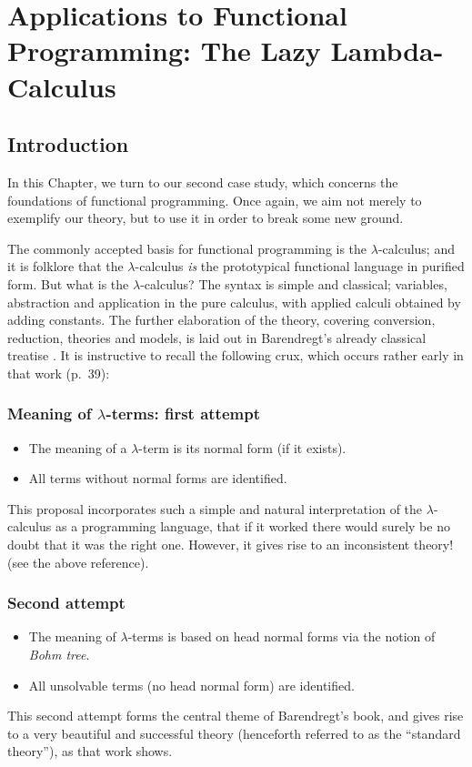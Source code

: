 \chapter{Applications to Functional Programming: 
The Lazy Lambda-Calculus}
\section{Introduction}
In this Chapter, we turn to our second case study, which concerns the 
foundations of functional programming. 
Once again, we aim not merely to exemplify our theory, 
but to use it in order to break some new ground.

The commonly accepted basis for functional programming is the 
$\lambda$-calculus; 
and it is folklore that the $\lambda$-calculus {\em is} the prototypical 
functional language in purified form. But what is the $\lambda$-calculus? 
The syntax is simple and classical; variables, abstraction and application 
in the pure calculus, with applied calculi obtained by adding constants. 
The further elaboration of the theory, covering conversion, reduction, 
theories and models, is laid out in Barendregt's already classical treatise 
\cite{Bar}. 
It is instructive to recall the following crux, which occurs rather early 
in that work (p.\  39):
\subsection*{Meaning of $\lambda$-terms: first attempt}
\begin{itemize}
\item The meaning of a $\lambda$-term is its normal form (if it exists).
\item All terms without normal forms are identified.
\end{itemize}
This proposal incorporates such a simple and natural interpretation of the 
$\lambda$-calculus as a programming language, that if it worked 
there would surely be no doubt that it was the right one. 
However, it gives rise to an inconsistent theory! (see the above reference).
\subsection*{Second attempt}
\begin{itemize}
\item The meaning of $\lambda$-terms is based on head normal forms 
via the notion of {\em Bohm tree}.
\item All unsolvable terms (no head normal form) are identified.
\end{itemize}
This second attempt forms the central theme of Barendregt's book, 
and gives rise to a very beautiful and successful theory 
(henceforth referred to as the ``standard theory''), as that work shows.

